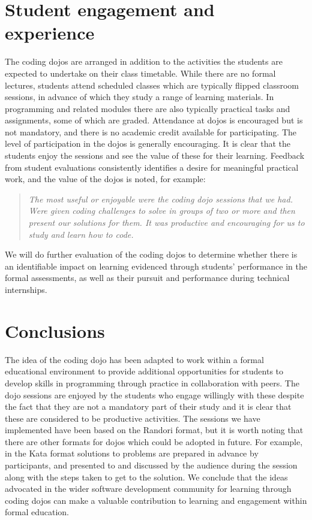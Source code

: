 \section{Student engagement and experience}
The coding dojos are arranged in addition to the activities the students are expected to undertake on their class timetable. While there are no formal lectures, students attend scheduled classes which are typically flipped classroom sessions, in advance of which they study a range of learning materials. In programming and related modules there are also typically practical tasks and assignments, some of which are graded. Attendance at dojos is encouraged but is not mandatory, and there is no academic credit available for participating. The level of participation in the dojos is generally encouraging. It is clear that the students enjoy the sessions and see the value of these for their learning. Feedback from student evaluations consistently identifies a desire for meaningful practical work, and the value of the dojos is noted, for example:
\begin{quote}\textit{The most useful or enjoyable were the coding dojo sessions that we had. Were given coding challenges to solve in groups of two or more and then present our solutions for them. It was productive and encouraging for us to study and learn how to code.}\end{quote}
We will do further evaluation of the coding dojos to determine whether there is an identifiable impact on learning evidenced through students' performance in the formal assessments, as well as their pursuit and performance during technical internships.

\section{Conclusions}
The idea of the coding dojo has been adapted to work within a formal educational environment to provide additional opportunities for students to develop skills in programming through practice in collaboration with peers. The dojo sessions are enjoyed by the students who engage willingly with these despite the fact that they are not a mandatory part of their study and it is clear that these are considered to be productive activities. 
The sessions we have implemented have been based on the Randori format, but it is worth noting that there are other formats for dojos which could be adopted in future. For example, in the Kata format \cite{aniche2011increasing} solutions to problems are prepared in advance by participants, and presented to and discussed by the audience during the session along with the steps taken to get to the solution.
We conclude that the ideas advocated in the wider software development community for learning through coding dojos can make a valuable contribution to learning and engagement within formal education.


